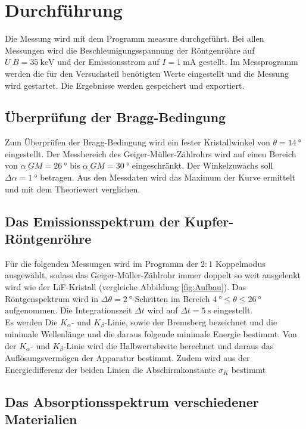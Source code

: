 
\section{Durchführung}
\label{sec:Durchführung}

Die Messung wird mit dem Programm measure durchgeführt.
Bei allen Messungen wird die Beschleunigungsspannung der Röntgenröhre auf $U_.B = \SI{35}{\kilo\electronvolt}$ und der Emissionsstrom auf $I = \SI{1}{\milli\ampere}$ gestellt. Im Messprogramm werden die für den Versuchsteil benötigten Werte eingestellt und die Messung wird gestartet. Die Ergebnisse werden gespeichert und exportiert.

\subsection{Überprüfung der Bragg-Bedingung}

Zum Überprüfen der Bragg-Bedingung wird ein fester Kristallwinkel von $\theta = \SI{14}{\degree}$ eingestellt. Der Messbereich des Geiger-Müller-Zählrohrs wird auf einen Bereich von $\alpha_.{GM} = \SI{26}{\degree}$ bis $\alpha_.{GM} = \SI{30}{\degree}$ eingeschränkt. Der Winkelzuwachs soll $\Delta\alpha = \SI{1}{\degree}$ betragen.
Aus den Messdaten wird das Maximum der Kurve ermittelt und mit dem Theoriewert verglichen.

\subsection{Das Emissionsspektrum der Kupfer-Röntgenröhre}

Für die folgenden Messungen wird im Programm der $2:1$ Koppelmodus ausgewählt, sodass das Geiger-Müller-Zählrohr immer doppelt so weit ausgelenkt wird wie der LiF-Kristall (vergleiche Abbildung \ref{fig:Aufbau}).
Das Röntgenspektrum wird in $\Delta\theta = \SI{2}{\degree}$-Schritten im Bereich $\SI{4}{\degree} \leq \theta \leq \SI{26}{\degree}$ aufgenommen. Die Integrationszeit $\Delta t$ wird auf $\Delta t=\SI{5}{\second}$ eingestellt.\\ 
Es werden Die $K_\alpha$- und $K_\beta$-Linie, sowie der Bremsberg bezeichnet und die minimale Wellenlänge und die daraus folgende minimale Energie bestimmt.
Von der $K_\alpha$- und $K_\beta$-Linie wird die Halbwertsbreite berechnet und daraus das Auflösungsvermögen der Apparatur bestimmt. Zudem wird aus der Energiedifferenz der beiden Linien die Abschirmkonstante $\sigma_K$ bestimmt

\subsection{Das Absorptionsspektrum verschiedener Materialien}

